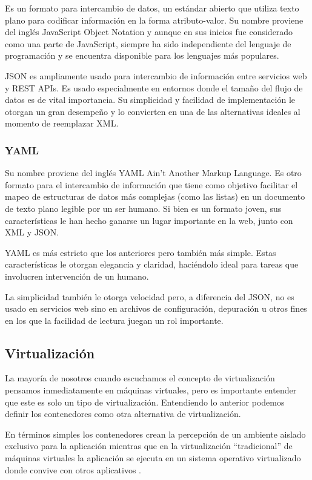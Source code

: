 Es un formato para intercambio de datos, un estándar abierto que utiliza texto plano para codificar información en la forma atributo-valor. Su nombre proviene del inglés JavaScript Object Notation y aunque en sus inicios fue considerado como una parte de JavaScript, siempre ha sido independiente del lenguaje de programación y se encuentra disponible para los lenguajes más populares.

JSON es ampliamente usado para intercambio de información entre servicios web y REST APIs. Es usado especialmente en entornos donde el tamaño del flujo de datos es de vital importancia. Su simplicidad y facilidad de implementación le otorgan un gran desempeño y lo convierten en una de las alternativas ideales al momento de reemplazar XML.

\subsubsection{YAML}

Su nombre proviene del inglés YAML Ain’t Another Markup Language. Es otro formato para el intercambio de información que tiene como objetivo facilitar el mapeo de estructuras de datos más complejas (como las listas) en un documento de texto plano legible por un ser humano. Si bien es un formato joven, sus características le han hecho ganarse un lugar importante en la web, junto con XML y JSON.

YAML es más estricto que los anteriores pero también más simple. Estas características le otorgan elegancia y claridad, haciéndolo ideal para tareas que involucren intervención de un humano.

La simplicidad también le otorga velocidad pero, a diferencia del JSON, no es usado en servicios web sino en archivos de configuración, depuración u otros fines en los que la facilidad de lectura juegan un rol importante.

\subsection{Virtualización}

La mayoría de nosotros cuando escuchamos el concepto de virtualización pensamos inmediatamente en máquinas virtuales, pero es importante entender que este es solo un tipo de virtualización. Entendiendo lo anterior podemos definir los contenedores como otra alternativa de virtualización.

En términos simples los contenedores crean la percepción de un ambiente aislado exclusivo para la aplicación mientras que en la virtualización “tradicional” de máquinas virtuales la aplicación se ejecuta en un sistema operativo virtualizado donde convive con otros aplicativos \cite{docker1}.

